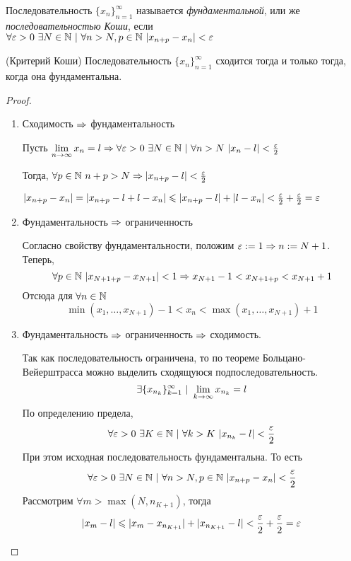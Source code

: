 \begin{definition}
	Последовательность $\{x_n\}_{n = 1}^\infty$ называется \textit{фундаментальной}, или же \textit{последовательностью Коши}, если $\forall \varepsilon > 0\ \exists N \in \mathbb{N}\ |\ \forall n > N, p \in \mathbb{N}\ |x_{n + p} - x_n| < \varepsilon$
\end{definition}

\begin{theorem} (Критерий Коши)
	Последовательность $\{x_n\}_{n = 1}^\infty$ сходится тогда и только тогда, когда она фундаментальна. 
\end{theorem}

\begin{proof}
	\begin{enumerate}
		\item Сходимость $\Rightarrow$ фундаментальность
		
		Пусть $\lim\limits_{n \rightarrow \infty} x_n = l \Rightarrow \forall \varepsilon > 0\ \exists N \in \mathbb{N}\ |\ \forall n > N\ |x_n - l| < \frac{\varepsilon}{2}$
		
		Тогда, $\forall p \in \mathbb{N}\ n + p > N \Rightarrow |x_{n + p} - l| < \frac{\varepsilon}{2}$
		
		$|x_{n + p} - x_n| = |x_{n + p} - l + l - x_n| \leqslant |x_{n + p} - l| + |l - x_n| < \frac{\varepsilon}{2} + \frac{\varepsilon}{2} = \varepsilon$
		
		\item Фундаментальность $\Rightarrow$ ограниченность
		
		Согласно свойству фундаментальности, положим $\varepsilon := 1 \Rightarrow n := N + 1$. Теперь, 
		$$
			\forall p \in \mathbb{N}\ |x_{N + 1 + p} - x_{N + 1}| < 1 \Rightarrow x_{N + 1} - 1 < x_{N + 1 + p} < x_{N + 1} + 1
		$$
		Отсюда для $\forall n \in \mathbb{N}$
		$$
			\min(x_1, \dots, x_{N + 1}) - 1 < x_n < \max(x_1, \dots, x_{N + 1}) + 1
 		$$
 		
 		\item Фундаментальность $\Rightarrow$ ограниченность $\Rightarrow$ сходимость. 
 		
		Так как последовательность ограничена, то по теореме Больцано-Вейерштрасса можно выделить сходящуюся подпоследовательность.
		$$
			\exists \{x_{n_k}\}_{k = 1}^\infty\ |\ \liml_{k \to \infty} x_{n_k} = l
		$$
		По определению предела,
		$$
			\forall \varepsilon > 0\ \exists K \in \mathbb{N}\ |\ \forall k > K\ |x_{n_k} - l| < \frac{\varepsilon}{2}
		$$
		При этом исходная последовательность фундаментальна. То есть
		$$
			\forall \varepsilon > 0\ \exists N \in \mathbb{N}\ |\ \forall n > N, p \in \mathbb{N}\ |x_{n + p} - x_n| < \frac{\varepsilon}{2}
		$$
		Рассмотрим $\forall                                                                                                                                                                                                                                                                                                                                                                                                                                                       m > \max(N, n_{K + 1})$, тогда
		$$
			|x_m - l| \leqslant |x_m - x_{n_{K + 1}}| + |x_{n_{K + 1}} - l| < \frac{\varepsilon}{2} + \frac{\varepsilon}{2} = \varepsilon
		$$
	\end{enumerate}
\end{proof}

